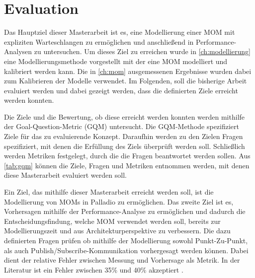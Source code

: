 
\chapter{Evaluation}
\label{ch:Evaluation}
Das Hauptziel dieser Masterarbeit ist es, eine Modellierung einer MOM mit expliziten Warteschlangen zu ermöglichen und anschließend in Performance-Analysen zu untersuchen. Um dieses Ziel zu erreichen wurde in \autoref{ch:modellierung} eine Modellierungsmethode vorgestellt mit der eine MOM modelliert und kalibriert werden kann. Die in \autoref{ch:mom} ausgemessenen Ergebnisse wurden dabei zum Kalibrieren der Modelle verwendet. Im Folgenden, soll die bisherige Arbeit evaluiert werden und dabei gezeigt werden, dass die definierten Ziele erreicht werden konnten. 

Die Ziele und die Bewertung, ob diese erreicht werden konnten werden mithilfe der Goal-Question-Metric (GQM) untersucht.
Die GQM-Methode \cite{gqm} spezifiziert Ziele für das zu evaluierende Konzept. Daraufhin werden zu den Zielen Fragen spezifiziert, mit denen die Erfüllung des Ziels überprüft werden soll. Schließlich werden Metriken festgelegt, durch die die Fragen beantwortet werden sollen. Aus \autoref{tab:gqm} können die Ziele, Fragen und Metriken entnommen werden, mit denen diese Masterarbeit evaluiert werden soll.

Ein Ziel, das mithilfe dieser Masterarbeit erreicht werden soll, ist die Modellierung von MOMs in Palladio zu ermöglichen. Das zweite Ziel ist es, Vorhersagen mithilfe der Performance-Analyse zu ermöglichen und dadurch die Entscheidungsfindung, welche MOM verwendet werden soll, bereits zur Modellierungszeit und aus Architekturperspektive zu verbessern. Die dazu definierten Fragen prüfen ob mithilfe der Modellierung sowohl Punkt-Zu-Punkt, als auch Publish/Subscribe-Kommunikation vorhergesagt werden können. Dabei dient der relative Fehler zwischen Messung und Vorhersage als Metrik. In der Literatur ist ein Fehler zwischen 35\% und 40\% akzeptiert \cite{error}.

